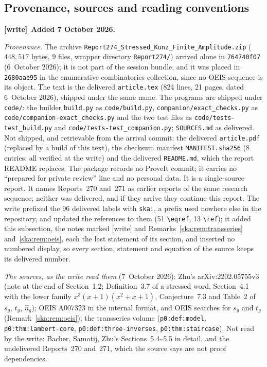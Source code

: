 \documentclass[11pt,letterpaper]{article}
\theoremstyle{definition}
\newcommand{\file}[1]{\nolinkurl{#1}}
\newenvironment{writenote}[1][]{\par\smallskip\begingroup\small
 \noindent\textbf{[write]}\if\relax\detokenize{#1}\relax\else~\textbf{#1.}\fi\ }%
 {\par\endgroup\smallskip}
\begin{document}
\subsection{Provenance, sources and reading conventions}\label{ska:sec:provenance}
\begin{writenote}[Added 7 October 2026]\raggedright
\emph{Provenance.} The archive \file{Report274_Stressed_Kunz_Finite_Amplitude.zip}
($448{,}517$ bytes, 9 files, wrapper directory \file{Report274/}) arrived
alone in \file{764740f07} (6~October 2026); it is not part of the session
bundle, and it was placed in \file{2680aae95} in the enumerative-combinatorics
collection, since no OEIS sequence is its object. The text is the delivered
\file{article.tex} (824 lines, 21 pages, dated 6~October 2026), shipped under
the same name. The programs are shipped under \file{code/}: the builder
\file{build.py} as \file{code/build.py}, \file{companion/exact_checks.py} as
\file{code/companion-exact_checks.py} and the two test files as
\file{code/tests-test_build.py} and \file{code/tests-test_companion.py};
\file{SOURCES.md} as delivered. Not shipped, and retrievable from the arrival
commit: the delivered \file{article.pdf} (replaced by a build of this text),
the checksum manifest \file{MANIFEST.sha256} (8 entries, all verified at the
write) and the delivered \file{README.md}, which the report README replaces.
The package records no ProveIt commit; it carries no ``prepared for private
review'' line and no personal data. It is a single-source report. It names
Reports~270 and~271 as earlier reports of the same research sequence; neither
was delivered, and if they arrive they continue this report. The write
prefixed the 96 delivered labels with \file{ska:}, a prefix used
nowhere else in the repository, and updated the references to them
(51 \verb|\eqref|, 13 \verb|\ref|); it added this subsection, the notes marked [write] and
Remarks~\ref{ska:rem:transseries} and~\ref{ska:rem:oeis}, each the last
statement of its section, and inserted no numbered display, so every
section, statement and equation of the source keeps its delivered number.

\emph{The sources, as the write read them} (7~October 2026): Zhu's
arXiv:2202.05755v3 (note at the end of Section~1.2; Definition~3.7 of a
stressed word, Section~4.1 with the lower family $x^3(x+1)(x^2+x+1)$,
Conjecture~7.3 and Table~2 of $s_g$, $t_g$, $\hat n_g$); OEIS A007323 in the
internal format, and OEIS searches for $s_g$ and $t_g$
(Remark~\ref{ska:rem:oeis}); the transseries volume
(\file{p0:def:model}, \file{p0:thm:lambert-core}, \file{p0:def:three-inverses},
\file{p0:thm:staircase}). Not read by the write: Bacher, Samotij, Zhu's
Sections~5.4--5.5 in detail, and the undelivered Reports~270 and~271, which
the source says are not proof dependencies.


\end{writenote}
\end{document}
